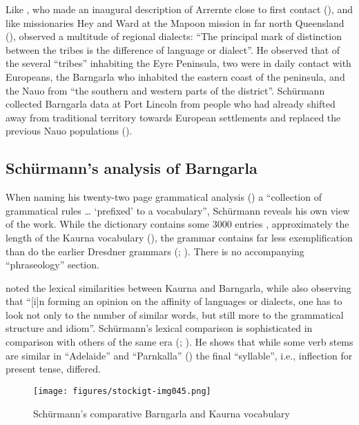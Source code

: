 Like \citet{kempe_grammar_1891}, who made an inaugural description of Arrernte close to first contact (), and like missionaries Hey and Ward at the Mapoon mission in far north Queensland (), \citet[249]{schurmann_aboriginal_1846} observed a multitude of regional dialects: “The principal mark of distinction between the tribes is the difference of language or dialect”. He observed that of the several “tribes” inhabiting the Eyre Peninsula, two were in daily contact with Europeans, the Barngarla who inhabited the eastern coast of the peninsula, and the Nauo from ``the southern and western parts of the district''. Schürmann collected Barngarla data at Port Lincoln from people who had already shifted away from traditional territory towards European settlements and replaced the previous Nauo populations (\citealt{hercus_tragedy_2001}).

\subsection{Schürmann’s analysis of Barngarla \citeyearpar{schurmann_vocabulary_1844}}
\label{sec:key:6.2.1}\label{bkm:Ref73715161}

When naming his twenty-two page grammatical analysis (\citeyear{schurmann_vocabulary_1844}) a ``collection of grammatical rules … `prefixed' to a vocabulary'', Schürmann reveals his own view of the work. While the dictionary contains some 3000 entries \citep[83]{rathjen_difficult_1998}, approximately the length of the Kaurna vocabulary (\citeyear*{TeichelmannSchürmann1840}), the grammar contains far less exemplification than do the earlier Dresdner grammars (\citealt{teichelmann_outlines_1840}; \citealt{meyer_vocabulary_1843}). There is no accompanying “phraseology” section.

\citet[iv]{schurmann_vocabulary_1844} noted the lexical similarities between Kaurna and Barngarla, while also observing that “[i]n forming an opinion on the affinity of languages or dialects, one has to look not only to the number of similar words, but still more to the grammatical structure and idiom”. Schürmann’s lexical comparison is sophisticated in comparison with others of the same era (\citealt{grey_vocabulary_1839}; \citealt{moorhouse_letter_1840}). He shows that while some verb stems are similar in “Adelaide” and “Parnkalla” () the final ``syllable'', i.e., inflection for present tense, differed.


\begin{figure}
\texttt{[image: figures/stockigt-img045.png]}
\caption{Schürmann’s comparative Barngarla and Kaurna vocabulary \citeyearpar[iv]{schurmann_vocabulary_1844}}
\label{fig:key:104}
\end{figure}

